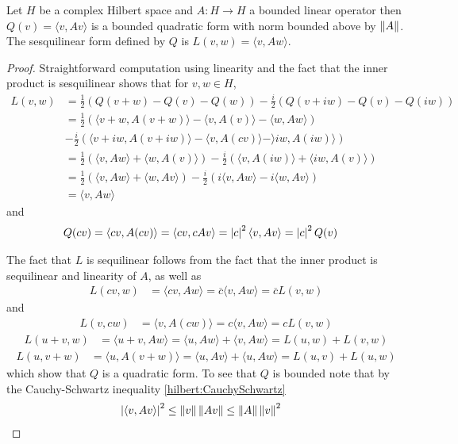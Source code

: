 \begin{prop}\label{hilbert:QuadraticFormFromOperator}Let $H$ be a complex Hilbert space and $A : H \to H$ a bounded linear operator then $Q(v) = \langle v, A v \rangle$ is a bounded quadratic form with norm bounded above by $\left \lVert A \right \rVert$.  The sesquilinear form defined by $Q$ is $L(v,w) = \langle v, Aw \rangle$.
\end{prop}
\begin{proof}
Straightforward computation using linearity and the fact that the inner product is sesquilinear shows that for $v,w \in H$,
\begin{align*}
L(v, w) &= \frac{1}{2} \left ( Q(v+w) - Q(v) - Q(w) \right) - \frac{i}{2} \left (Q(v+iw) - Q(v) - Q(iw) \right) \\
&= \frac{1}{2} \left ( \langle v+w, A(v+w) \rangle - \langle v, A(v) \rangle - \langle w, Aw \rangle \right) \\
&- \frac{i}{2} \left ( \langle v+iw, A(v + iw) \rangle - \langle v, A(cv) \rangle - \rangle iw, A(iw) \rangle \right) \\
&= \frac{1}{2} \left ( \langle v, Aw \rangle + \langle w, A(v) \rangle \right) - \frac{i}{2} \left ( \langle v, A(iw) \rangle + \langle iw, A(v) \rangle \right) \\
&= \frac{1}{2} \left ( \langle v, Aw \rangle +  \langle w, Av \rangle \right) - \frac{i}{2} \left ( i \langle v, Aw \rangle - i\langle w, Av \rangle \right) \\
&= \langle v, Aw \rangle 
\end{align*}
and
\begin{align*}
Q(cv) &= \langle cv, A (cv) \rangle = \langle cv, c A v \rangle = \left \vert c \right \vert^2 \langle v, A v \rangle = \left \vert c \right \vert^2Q(v)
\end{align*}

The fact that $L$ is sequilinear follows from the fact that the inner product is sequilinear and linearity of $A$,
as well as 
\begin{align*}
L(cv, w) &= \langle cv, Aw \rangle = \overline{c} \langle v, Aw \rangle = \overline{c} L(v,w)
\end{align*}
and
\begin{align*}
L(v, cw) &= \langle v, A(cw) \rangle = c \langle v, Aw \rangle = c L(v,w)
\end{align*}
\begin{align*}
L(u+v, w) &=\langle u+v, Aw \rangle = \langle u, Aw \rangle + \langle v, Aw \rangle = L(u,w) + L(v,w)
\end{align*}
\begin{align*}
L(u, v+w) &= \langle u, A(v+w) \rangle = \langle u, Av \rangle + \langle u, Aw \rangle = L(u,v) + L(u,w)
\end{align*}
which show that $Q$ is a quadratic form.  To see that $Q$ is bounded note that by the Cauchy-Schwartz inequality \ref{hilbert:CauchySchwartz}
\begin{align*}
\left \vert \langle v, Av \rangle \right \vert^2 &\leq \left \lVert v \right \rVert \left \lVert Av \right \rVert \leq \left \lVert A \right \rVert \left \lVert v \right \rVert^2
\end{align*}
\end{proof}

